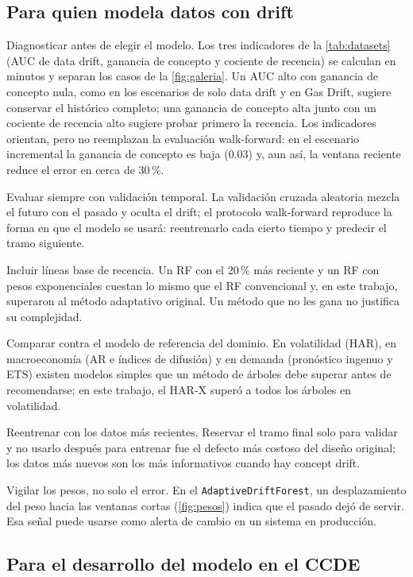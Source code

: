 \documentclass[11pt,a4paper]{article}
\begin{document}
\subsection{Para quien modela datos con drift}

Diagnosticar antes de elegir el modelo. Los tres indicadores de la \cref{tab:datasets} (AUC de data
drift, ganancia de concepto y cociente de recencia) se calculan en minutos y separan los casos de la
\cref{fig:galeria}. Un AUC alto con ganancia de concepto nula, como en los escenarios de solo data
drift y en Gas Drift, sugiere conservar el histórico completo; una ganancia de concepto alta junto con
un cociente de recencia alto sugiere probar primero la recencia. Los indicadores orientan, pero no
reemplazan la evaluación walk-forward: en el escenario incremental la ganancia de concepto es baja
(0.03) y, aun así, la ventana reciente reduce el error en cerca de 30\,\%.

Evaluar siempre con validación temporal. La validación cruzada aleatoria mezcla el futuro con el
pasado y oculta el drift; el protocolo walk-forward reproduce la forma en que el modelo se usará:
reentrenarlo cada cierto tiempo y predecir el tramo siguiente.

Incluir líneas base de recencia. Un RF con el 20\,\% más reciente y un RF con pesos exponenciales
cuestan lo mismo que el RF convencional y, en este trabajo, superaron al método adaptativo original.
Un método que no les gana no justifica su complejidad.

Comparar contra el modelo de referencia del dominio. En volatilidad (HAR), en macroeconomía (AR e
índices de difusión) y en demanda (pronóstico ingenuo y ETS) existen modelos simples que un método de
árboles debe superar antes de recomendarse; en este trabajo, el HAR-X superó a todos los árboles en
volatilidad.

Reentrenar con los datos más recientes. Reservar el tramo final solo para validar y no usarlo después
para entrenar fue el defecto más costoso del diseño original; los datos más nuevos son los más
informativos cuando hay concept drift.

Vigilar los pesos, no solo el error. En el \texttt{AdaptiveDriftForest}, un desplazamiento del peso
hacia las ventanas cortas (\cref{fig:pesos}) indica que el pasado dejó de servir. Esa señal puede
usarse como alerta de cambio en un sistema en producción.

\subsection{Para el desarrollo del modelo en el CCDE}
\end{document}
